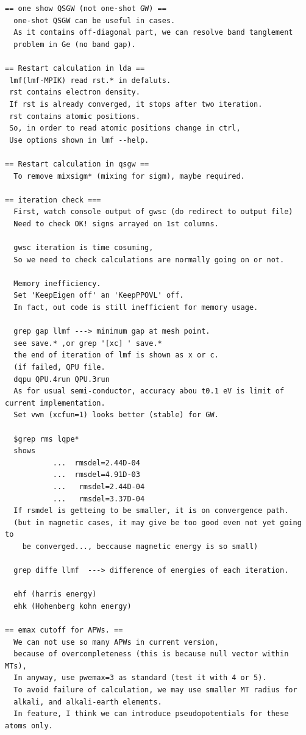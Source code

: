 {\begin{enumerate}
\end{enumerate}
\begin{verbatim}


== one show QSGW (not one-shot GW) ==
  one-shot QSGW can be useful in cases.
  As it contains off-diagonal part, we can resolve band tanglement
  problem in Ge (no band gap).

== Restart calculation in lda ==
 lmf(lmf-MPIK) read rst.* in defaluts.
 rst contains electron density.
 If rst is already converged, it stops after two iteration.
 rst contains atomic positions.
 So, in order to read atomic positions change in ctrl,
 Use options shown in lmf --help.

== Restart calculation in qsgw ==
  To remove mixsigm* (mixing for sigm), maybe required.

== iteration check ===
  First, watch console output of gwsc (do redirect to output file)
  Need to check OK! signs arrayed on 1st columns.

  gwsc iteration is time cosuming,
  So we need to check calculations are normally going on or not.

  Memory inefficiency.
  Set 'KeepEigen off' an 'KeepPPOVL' off.
  In fact, out code is still inefficient for memory usage.
  
  grep gap llmf ---> minimum gap at mesh point.
  see save.* ,or grep '[xc] ' save.*
  the end of iteration of lmf is shown as x or c.
  (if failed, QPU file. 
  dqpu QPU.4run QPU.3run
  As for usual semi-conductor, accuracy abou t0.1 eV is limit of current implementation.
  Set vwn (xcfun=1) looks better (stable) for GW.

  $grep rms lqpe* 
  shows
           ...  rmsdel=2.44D-04
           ...  rmsdel=4.91D-03
           ...   rmsdel=2.44D-04
           ...   rmsdel=3.37D-04
  If rsmdel is getteing to be smaller, it is on convergence path.
  (but in magnetic cases, it may give be too good even not yet going to
	be converged..., beccause magnetic energy is so small)

  grep diffe llmf  ---> difference of energies of each iteration.

  ehf (harris energy)
  ehk (Hohenberg kohn energy)

== emax cutoff for APWs. ==
  We can not use so many APWs in current version,
  because of overcompleteness (this is because null vector within MTs), 
  In anyway, use pwemax=3 as standard (test it with 4 or 5).
  To avoid failure of calculation, we may use smaller MT radius for
  alkali, and alkali-earth elements. 
  In feature, I think we can introduce pseudopotentials for these atoms only.


\end{verbatim}}
